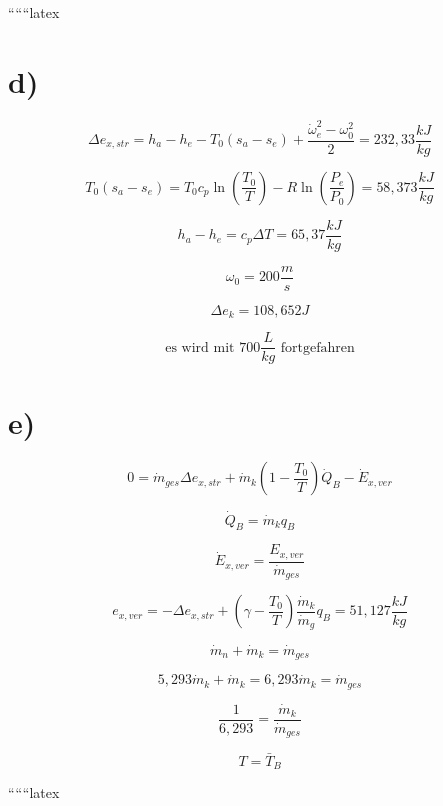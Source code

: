 ``````latex


\section*{d)}

\[
\Delta e_{x, str} = h_a - h_e - T_0 (s_a - s_e) + \frac{\dot{\omega}_e^2 - \omega_0^2}{2} = 232,33 \frac{kJ}{kg}
\]

\[
T_0 (s_a - s_e) = T_0 c_p \ln \left( \frac{T_0}{T} \right) - R \ln \left( \frac{P_e}{P_0} \right) = 58,373 \frac{kJ}{kg}
\]

\[
h_a - h_e = c_p \Delta T = 65,37 \frac{kJ}{kg}
\]

\[
\omega_0 = 200 \frac{m}{s}
\]

\[
\Delta e_k = 108,652 J
\]

\[
\text{es wird mit } 700 \frac{L}{kg} \text{ fortgefahren}
\]

\section*{e)}

\[
0 = \dot{m}_{ges} \Delta e_{x, str} + \dot{m}_k \left( 1 - \frac{T_0}{T} \right) \dot{Q}_B - \dot{E}_{x, ver}
\]

\[
\dot{Q}_B = \dot{m}_k q_B
\]

\[
\dot{E}_{x, ver} = \frac{E_{x, ver}}{\dot{m}_{ges}}
\]

\[
e_{x, ver} = -\Delta e_{x, str} + \left( \gamma - \frac{T_0}{T} \right) \frac{\dot{m}_k}{\dot{m}_g} q_B = 51,127 \frac{kJ}{kg}
\]

\[
\dot{m}_n + \dot{m}_k = \dot{m}_{ges}
\]

\[
5,293 \dot{m}_k + \dot{m}_k = 6,293 \dot{m}_k = \dot{m}_{ges}
\]

\[
\frac{1}{6,293} = \frac{\dot{m}_k}{\dot{m}_{ges}}
\]

\[
T = \bar{T}_B
\]

``````latex


